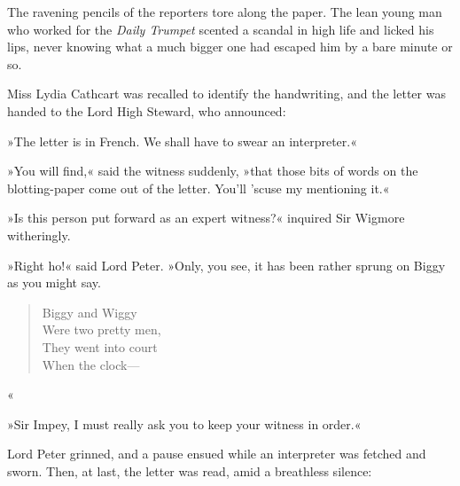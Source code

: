 The ravening pencils of the reporters tore along the paper. The lean
young man who worked for the \textit{Daily Trumpet} scented a scandal in high
life and licked his lips, never knowing what a much bigger one had
escaped him by a bare minute or so.

Miss Lydia Cathcart was recalled to identify the handwriting, and the
letter was handed to the Lord High Steward, who announced:

»The letter is in French. We shall have to swear an interpreter.«

»You will find,« said the witness suddenly, »that those bits of
words on the blotting-paper come out of the letter. You'll 'scuse my
mentioning it.«

»Is this person put forward as an expert witness?« inquired Sir Wigmore
witheringly.

»Right ho!« said Lord Peter. »Only, you see, it has been rather sprung
on Biggy as you might say.

\begin{verse}
Biggy and Wiggy\\
Were two pretty men,\\
They went into court\\
When the clock—\\
\end{verse}
«

»Sir Impey, I must really ask you to keep your witness in order.«

Lord Peter grinned, and a pause ensued while an interpreter was fetched
and sworn. Then, at last, the letter was read, amid a breathless
silence:

